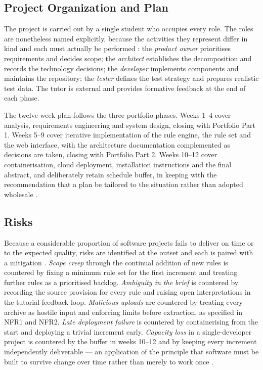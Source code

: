 \documentclass[a4paper,11pt]{article}
\begin{document}
\subsection{Project Organization and Plan}\label{subsec:plan}

The project is carried out by a single student who occupies every role. The
roles are nonetheless named explicitly, because the activities they represent
differ in kind and each must actually be performed \citep{Sommerville2020}: the
\textit{product owner} prioritises requirements and decides scope; the
\textit{architect} establishes the decomposition and records the technology
decisions; the \textit{developer} implements components and maintains the
repository; the \textit{tester} defines the test strategy and prepares realistic
test data. The tutor is external and provides formative feedback at the end of
each phase.

The twelve-week plan follows the three portfolio phases. Weeks 1--4 cover
analysis, requirements engineering and system design, closing with Portfolio
Part 1. Weeks 5--9 cover iterative implementation of the rule engine, the rule
set and the web interface, with the architecture documentation complemented as
decisions are taken, closing with Portfolio Part 2. Weeks 10--12 cover
containerisation, cloud deployment, installation instructions and the final
abstract, and deliberately retain schedule buffer, in keeping with the
recommendation that a plan be tailored to the situation rather than adopted
wholesale \citep{Ambler2022}.

\subsection{Risks}\label{subsec:risks}

Because a considerable proportion of software projects fails to deliver on time
or to the expected quality, risks are identified at the outset and each is paired
with a mitigation \citep{Sommerville2020}. \textit{Scope creep} through the
continual addition of new rules is countered by fixing a minimum rule set for
the first increment and treating further rules as a prioritised backlog.
\textit{Ambiguity in the brief} is countered by recording the source provision
for every rule and raising open interpretations in the tutorial feedback loop.
\textit{Malicious uploads} are countered by treating every archive as hostile
input and enforcing limits before extraction, as specified in NFR1 and NFR2.
\textit{Late deployment failure}
is countered by containerising from the start and deploying a trivial increment
early. \textit{Capacity loss} in a single-developer project is countered by the
buffer in weeks 10--12 and by keeping every increment independently deliverable
--- an application of the principle that software must be built to survive
change over time rather than merely to work once \citep{Winters2020}.
\end{document}
